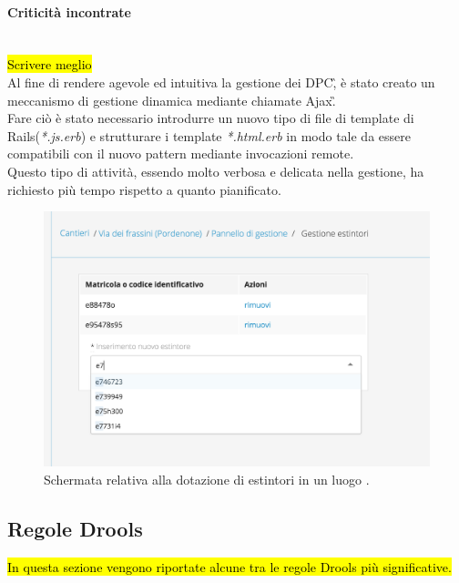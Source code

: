 	\paragraph*{Criticità incontrate}\mbox{}\\
	\hl{Scrivere meglio}\\
	Al fine di rendere agevole ed intuitiva la gestione dei \gls{DPC}\G, è stato creato un meccanismo di gestione dinamica mediante chiamate \gls{Ajax}\G. \\
	Fare ciò è stato necessario introdurre un nuovo tipo di file di template di Rails(\textit{*.js.erb}) e strutturare i template \textit{*.html.erb} in modo tale da essere compatibili con il nuovo pattern mediante invocazioni remote.\\
	Questo tipo di attività, essendo molto verbosa e delicata nella gestione, ha richiesto più tempo rispetto a quanto pianificato.
		\begin{figure}[H]
			\begin{center}
				\includegraphics[width=12cm]{Pics/ScreenRemoteTrueEstintori.png}
				\caption{Schermata relativa alla dotazione di estintori in un luogo .}
				\label{fig:ScreenRemoteTrueEstintori}
			\end{center}
		\end{figure}
		

\newpage
\subsection{Regole Drools}
\label{Drools:regole}
\hl{In questa sezione vengono riportate alcune tra le regole Drools più significative.}
